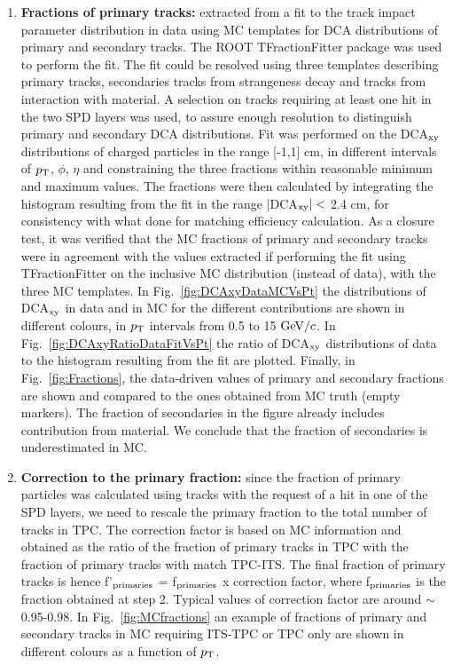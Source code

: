 \begin{enumerate}
\item {\bf Fractions of primary tracks:} extracted from a fit to
 the track impact parameter distribution in data using MC templates for 
 DCA distributions of primary and secondary tracks. The ROOT TFractionFitter 
 package was used to perform the fit. The fit could be resolved 
 using three templates describing primary tracks, secondaries tracks
 from strangeness decay and tracks from interaction with material. 
 A selection on tracks requiring at least one hit in the two SPD layers 
 was used, to assure enough resolution to distinguish primary and 
 secondary DCA distributions.
Fit was performed on the DCA$_{\rm xy}$ distributions of charged particles 
in the range [-1,1] cm, in different intervals of $p_{\rm T}$, $\phi$, $\eta$ 
and constraining the three fractions within reasonable minimum and maximum values.
The fractions were then calculated by integrating the histogram 
resulting from the fit in the range $|$DCA$_{\rm xy}|<$ 2.4 cm, for
consistency with what done for matching efficiency calculation. 
As a closure test, it was verified that the MC fractions of primary and secondary tracks 
were in agreement with the values extracted if performing the fit using TFractionFitter 
on the inclusive MC distribution (instead of data), with the three MC templates.  
In Fig.~\ref{fig:DCAxyDataMCVsPt} the distributions of DCA$_{\rm xy}$ 
in data and in MC for the different contributions are
shown in different colours, in $p_{\rm T}$ intervals from 0.5 to 15 $\mathrm{GeV}/c$. 
In Fig.~\ref{fig:DCAxyRatioDataFitVsPt} the ratio of DCA$_{\rm xy}$ distributions 
of data to the histogram resulting from the fit are plotted. 
Finally, in Fig.~\ref{fig:Fractions}, the data-driven values of primary and secondary
 fractions are shown and compared to 
 the ones obtained from MC truth (empty markers). 
The fraction of secondaries in the figure already includes contribution 
from material. We conclude that the fraction of secondaries is underestimated in MC.

\item {\bf Correction to the primary fraction:} since the fraction of primary
 particles was calculated using tracks with the request of a hit in one of the SPD layers, we
need to rescale the primary fraction to the total number of tracks in TPC. 
The correction factor is based on MC information and obtained as 
the ratio of the fraction of primary tracks in TPC with the fraction of primary
 tracks with match TPC-ITS. The final fraction of primary tracks is hence
  f'$_{\rm primaries}$ = f$_{\rm primaries}$ x correction factor, 
  where f$_{\rm primaries}$ is the fraction obtained at step 2. 
  Typical values of correction factor are around $\sim$ 0.95-0.98. 
  In Fig.~\ref{fig:MCfractions} an example of fractions of primary 
  and secondary tracks in MC requiring ITS-TPC or TPC only are 
  shown in different colours as a function of $p_{\rm T}$.


\end{enumerate}
